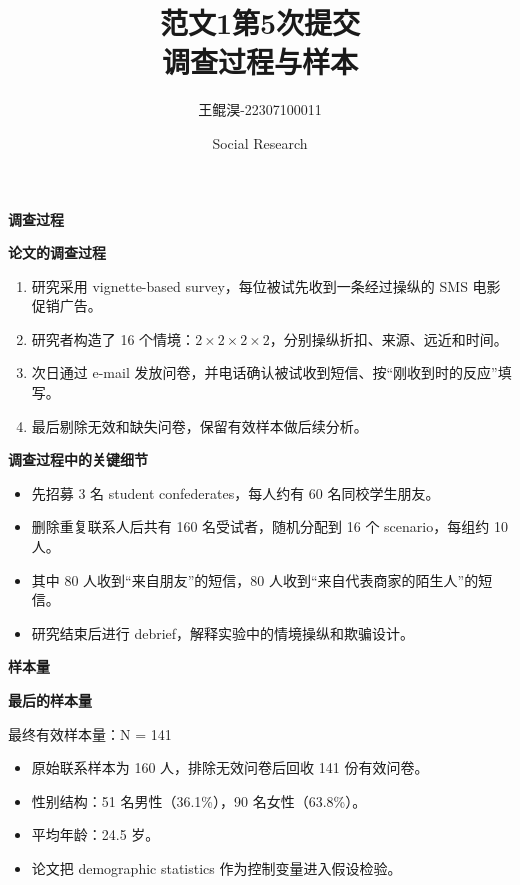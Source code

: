 \documentclass[aspectratio=169,UTF8,zihao=-4]{ctexbeamer}
\title{范文1第5次提交\\调查过程与样本}
\author{王鲲淏-22307100011}
\date{Social Research}
\newcommand{\bigidea}[1]{
  \begin{center}
    \vspace{0.8em}
    {\LARGE \bfseries #1}
    \vspace{0.6em}
  \end{center}
}
\newcommand{\sectionpageframe}[1]{
  \begin{frame}[plain]
    \begin{center}
      \vfill
      {\Huge \bfseries #1}
      \vfill
    \end{center}
  \end{frame}
}
\begin{document}
\begin{frame}[plain]
  \titlepage
\end{frame}

\sectionpageframe{调查过程}

\begin{frame}
  \bigidea{论文的调查过程}
  \begin{enumerate}
    \item \Large 研究采用 vignette-based survey，每位被试先收到一条经过操纵的 SMS 电影促销广告。
    \item \Large 研究者构造了 16 个情境：$2 \times 2 \times 2 \times 2$，分别操纵折扣、来源、远近和时间。
    \item \Large 次日通过 e-mail 发放问卷，并电话确认被试收到短信、按“刚收到时的反应”填写。
    \item \Large 最后剔除无效和缺失问卷，保留有效样本做后续分析。
  \end{enumerate}
\end{frame}

\begin{frame}
  \bigidea{调查过程中的关键细节}
  \begin{itemize}
    \item \Large 先招募 3 名 student confederates，每人约有 60 名同校学生朋友。
    \item \Large 删除重复联系人后共有 160 名受试者，随机分配到 16 个 scenario，每组约 10 人。
    \item \Large 其中 80 人收到“来自朋友”的短信，80 人收到“来自代表商家的陌生人”的短信。
    \item \Large 研究结束后进行 debrief，解释实验中的情境操纵和欺骗设计。
  \end{itemize}
\end{frame}

\sectionpageframe{样本量}

\begin{frame}
  \bigidea{最后的样本量}
  \begin{center}
    {\Large 最终有效样本量：\alert{N = 141}}
  \end{center}
  \vspace{1em}
  \begin{itemize}
    \item \Large 原始联系样本为 160 人，排除无效问卷后回收 141 份有效问卷。
    \item \Large 性别结构：51 名男性（36.1\%），90 名女性（63.8\%）。
    \item \Large 平均年龄：24.5 岁。
    \item \Large 论文把 demographic statistics 作为控制变量进入假设检验。
  \end{itemize}
\end{frame}
\end{document}
